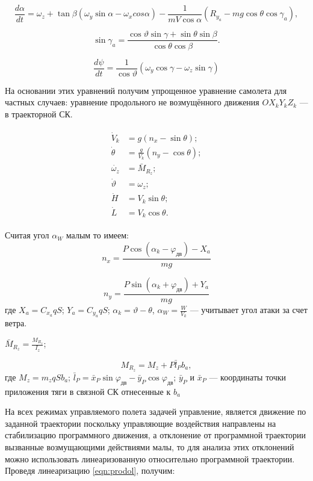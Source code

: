\documentclass{article}
\begin{document}
\[
	\frac{d\alpha}{dt} = \omega_z + \tan{\beta}(\omega_y \sin{\alpha} -
	\omega_x cos{\alpha}) - \frac{1}{mV \cos{\alpha}} (R_{y_a} - mg\cos{\theta}
	\cos{\gamma_a}),
\]

\[
	\sin{\gamma_a} = \frac{\cos{\vartheta} \sin{\gamma} + \sin{\theta}
		\sin{\beta}}{\cos{\theta} \cos{\beta}}.
\]

\[
	\frac{d\psi}{dt} = \frac{1}{\cos{\vartheta}}(\omega_y \cos{\gamma} -
	\omega_z \sin{\gamma})
\]

На основании этих уравнений получим упрощенное уравнение самолета для частных
случаев:
уравнение продольного не возмущённого движения $OX_k Y_k Z_k$ --- в траекторной
СК.

\begin{align}
	\label{eqn:prodol}
	\begin{split}
		\dot{V}_k&= g(n_x - \sin{\theta});
		\\
		\dot{\theta}&= \frac{g}{V_k} (n_y - \cos{\theta});
		\\
		\dot{\omega_z}&= \bar{M}_{R_z};
		\\
		\dot{\vartheta}&= \omega_{z};
		\\
		\dot{H}&= V_k \sin{\theta};
		\\
		\dot{L}&= V_k \cos{\theta}.
	\end{split}
\end{align}

Считая угол $\alpha_W$ малым то имеем:
\[
	n_x = \frac{P\cos{(\alpha_k - \varphi_\text{дв})} - X_a}{mg}
\]

\[
	n_y = \frac{P \sin{(\alpha_k + \varphi_\text{дв})} + Y_a}{mg}
\]
где $X_a = C_{x_a} q S$; $Y_a = C_{y_a} q S$; $\alpha_k = \vartheta - \theta$,
$\alpha_W = \frac{W}{V_k}$ --- учитывает угол атаки за счет ветра.

$\bar{M}_{R_z} = \frac{M_{R_z}}{I_z}$;

\[
	M_{R_z} = M_z + P \bar{l}_P b_a,
\]
где $M_z = m_z q S b_a$; $\bar{l}_P = \bar{x}_P \sin{\varphi_\text{дв}} -
	\bar{y}_P \cos{\varphi_\text{дв}}$; $\bar{y}_P$ и $\bar{x}_P$ --- координаты
точки приложения тяги в связной СК отнесенные к $b_a$

На всех режимах управляемого полета задачей управление, является движение по
заданной траектории поскольку управляющие воздействия направлены на
стабилизацию программного движения, а отклонение от программной траектории
вызванные возмущающими действиями малы, то для анализа этих отклонений можно
использовать линеаризованную относительно программной траектории. Проведя
линеаризацию
\eqref{eqn:prodol}, получим:
\end{document}
